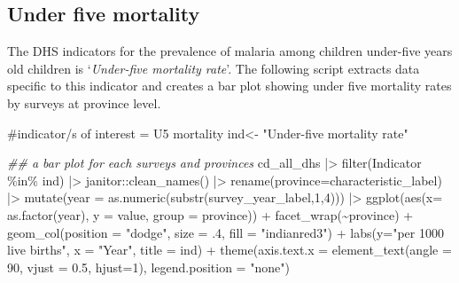 \documentclass[
  letterpaper,
  DIV=11,
  numbers=noendperiod]{scrreprt}
\newenvironment{Shaded}{\begin{snugshade}}{\end{snugshade}}
\newcommand{\AttributeTok}[1]{\textcolor[rgb]{0.40,0.45,0.13}{#1}}
\newcommand{\CommentTok}[1]{\textcolor[rgb]{0.37,0.37,0.37}{#1}}
\newcommand{\DecValTok}[1]{\textcolor[rgb]{0.68,0.00,0.00}{#1}}
\newcommand{\DocumentationTok}[1]{\textcolor[rgb]{0.37,0.37,0.37}{\textit{#1}}}
\newcommand{\FloatTok}[1]{\textcolor[rgb]{0.68,0.00,0.00}{#1}}
\newcommand{\FunctionTok}[1]{\textcolor[rgb]{0.28,0.35,0.67}{#1}}
\newcommand{\NormalTok}[1]{\textcolor[rgb]{0.00,0.23,0.31}{#1}}
\newcommand{\OtherTok}[1]{\textcolor[rgb]{0.00,0.23,0.31}{#1}}
\newcommand{\SpecialCharTok}[1]{\textcolor[rgb]{0.37,0.37,0.37}{#1}}
\newcommand{\StringTok}[1]{\textcolor[rgb]{0.13,0.47,0.30}{#1}}
\begin{document}
\hypertarget{under-five-mortality}{%
\subsection{Under five mortality}\label{under-five-mortality}}

The DHS indicators for the prevalence of malaria among children
under-five years old children is `\emph{Under-five mortality rate}'. The
following script extracts data specific to this indicator and creates a
bar plot showing under five mortality rates by surveys at province
level.

\begin{Shaded}
\begin{Highlighting}[]
\CommentTok{\#indicator/s of interest = U5 mortality }
\NormalTok{ind}\OtherTok{\textless{}{-}} \StringTok{"Under{-}five mortality rate"}     

\DocumentationTok{\#\# a bar plot for each surveys and provinces }
\NormalTok{  cd\_all\_dhs }\SpecialCharTok{|\textgreater{}}   
  \FunctionTok{filter}\NormalTok{(Indicator }\SpecialCharTok{\%in\%}\NormalTok{ ind) }\SpecialCharTok{|\textgreater{}}
\NormalTok{    janitor}\SpecialCharTok{::}\FunctionTok{clean\_names}\NormalTok{() }\SpecialCharTok{|\textgreater{}}  
    \FunctionTok{rename}\NormalTok{(}\AttributeTok{province=}\NormalTok{characteristic\_label) }\SpecialCharTok{|\textgreater{}}
    \FunctionTok{mutate}\NormalTok{(}\AttributeTok{year =} \FunctionTok{as.numeric}\NormalTok{(}\FunctionTok{substr}\NormalTok{(survey\_year\_label,}\DecValTok{1}\NormalTok{,}\DecValTok{4}\NormalTok{))) }\SpecialCharTok{|\textgreater{}}
    \FunctionTok{ggplot}\NormalTok{(}\FunctionTok{aes}\NormalTok{(}\AttributeTok{x=} \FunctionTok{as.factor}\NormalTok{(year), }\AttributeTok{y =}\NormalTok{ value, }\AttributeTok{group =}\NormalTok{ province)) }\SpecialCharTok{+}
    \FunctionTok{facet\_wrap}\NormalTok{(}\SpecialCharTok{\textasciitilde{}}\NormalTok{province) }\SpecialCharTok{+}
    \FunctionTok{geom\_col}\NormalTok{(}\AttributeTok{position =} \StringTok{"dodge"}\NormalTok{, }\AttributeTok{size =}\NormalTok{ .}\DecValTok{4}\NormalTok{, }\AttributeTok{fill =} \StringTok{"indianred3"}\NormalTok{) }\SpecialCharTok{+}
    \FunctionTok{labs}\NormalTok{(}\AttributeTok{y=}\StringTok{"per 1000 live births"}\NormalTok{, }\AttributeTok{x =} \StringTok{"Year"}\NormalTok{,}
       \AttributeTok{title =}\NormalTok{ ind) }\SpecialCharTok{+}
    \FunctionTok{theme}\NormalTok{(}\AttributeTok{axis.text.x =} \FunctionTok{element\_text}\NormalTok{(}\AttributeTok{angle =} \DecValTok{90}\NormalTok{, }\AttributeTok{vjust =} \FloatTok{0.5}\NormalTok{, }\AttributeTok{hjust=}\DecValTok{1}\NormalTok{),}
          \AttributeTok{legend.position =} \StringTok{"none"}\NormalTok{)}
\end{Highlighting}
\end{Shaded}
\end{document}
